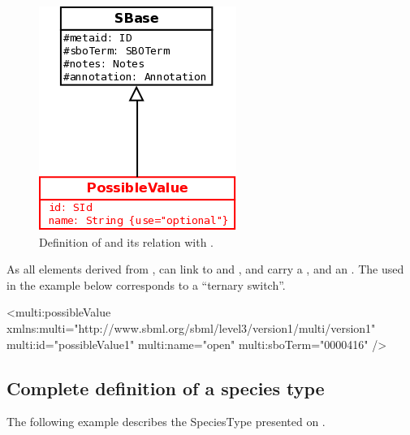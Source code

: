 \begin{figure}[H]
\begin{center}
\includegraphics[scale=0.3]{figs/pngs/PossibleValueClass.png} 
\caption{Definition of  and its relation with .}
\label{fig:PossibleValueClass}
\end{center}
\end{figure}

As all elements derived from ,  can link to  and , and carry a , and an . The  used in the example below corresponds to a ``ternary switch''. 

\begin{example}
<multi:possibleValue 
                     xmlns:multi="http://www.sbml.org/sbml/level3/version1/multi/version1" 
                     multi:id="possibleValue1" 
                     multi:name="open"
                     multi:sboTerm="0000416" />
\end{example}

\subsection{Complete definition of a species type}

The following example describes the SpeciesType presented on .

